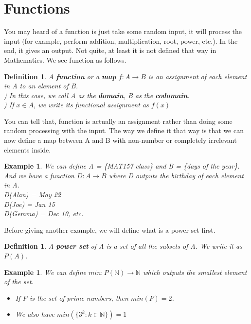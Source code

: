 \documentclass{book}
\newtheorem{definition}[theorem]{Definition}
\newtheorem{example}[theorem]{Example}
\begin{document}
\section{Functions}
You may heard of a function is just take some random input, it will process the input (for example, perform addition, multiplication, root, power, etc.). In the end, it gives an output. Not quite, at least it is not defined that way in Mathematics. We see function as follows.

\begin{definition}
    A \textbf{function} or a \textbf{map} $f : A \rightarrow B$ is an assignment of each element in A to an element of B. \\
    ) In this case, we call A as the \textbf{domain}, B as the \textbf{codomain}. \\
    ) If $x \in A$, we write its functional assignment as $f(x)$
\end{definition}

You can tell that, function is actually an assignment rather than doing some random processing with the input. The way we define it that way is that we can now define a map between A and B with non-number or completely irrelevant elements inside.

\begin{example}
    We can define A = \{MAT157 class\} and B = \{days of the year\}. And we have a function $D : A \rightarrow B$ where D outputs the birthday of each element in A. \\
    \indent D(Alan) = May 22 \\
    \indent D(Joe) = Jan 15 \\
    \indent D(Gemma) = Dec 10, etc.
\end{example}

Before giving another example, we will define what is a power set first.

\begin{definition}
    A \textbf{power set} of A is a set of all the subsets of A. We write it as $P(A)$.
\end{definition}

\begin{example}
    We can define $min : P(\mathbb{N}) \rightarrow \mathbb{N}$ which outputs the smallest element of the set.
    \begin{itemize}
        \item If P is the set of prime numbers, then $min(P) = 2$.
        \item We also have $min(\{ 3^{k} : k \in \mathbb{N} \}) = 1$
    \end{itemize}
\end{example}
\end{document}
